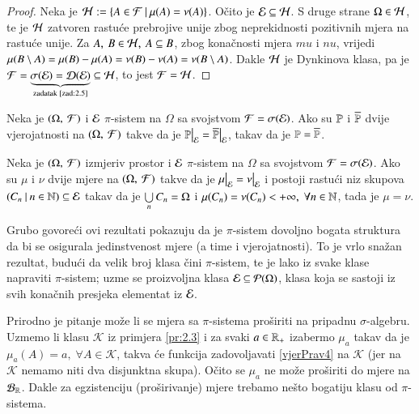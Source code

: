 \begin{proof}
    Neka je $\mathcal{H} := \{{A \in \mathcal{F}} \: | \: {\mu({A}) = \nu(A)}\}$.
    O\v cito je $\mathcal{E} \subseteq \mathcal{H}$. S druge strane $\Omega \in \mathcal{H}$,
    te je $\mathcal{H}$ zatvoren rastu\' ce prebrojive unije zbog
    neprekidnosti pozitivnih mjera na rastu\' ce unije.
    Za $A, \: B \in \mathcal{H}, \: A \subseteq B$, zbog kona\v cnosti mjera
    $mu$ i $nu$, vrijedi $\mu({B \setminus A}) = \mu({B})
    - \mu({A}) = \nu(B) - \nu(A) = \nu(B \setminus A)$.
    Dakle $\mathcal{H}$ je Dynkinova klasa, pa je $\mathcal{F} = \underbrace{
    \sigma({\mathcal{E}}) = \mathcal{D}({\mathcal{E}})}_{\textnormal{zadatak \ref{zad:2.5}}}
    \subseteq \mathcal{H}$, to jest $\mathcal{F} = \mathcal{H}$.
\end{proof}

\begin{kor} \label{kor:2.7}
    Neka je $(\Omega, \: \mathcal{F})$ i $\mathcal{E}$ $\pi$-sistem na $\Omega$ sa
    svojstvom $\mathcal{F} = \sigma({\mathcal{E}})$. Ako su $\mathbb{P}$ i $\overline{\mathbb{P}}$
    dvije vjerojatnosti na $(\Omega, \: \mathcal{F})$ takve da je
    $\restr{\Pp}{\E} = \restr{\overline{\Pp}}{\E}$, takav da je $\mathbb{P}
    = \overline{\mathbb{P}}$.
\end{kor}

\begin{zad} \label{zad:2.9}
    Neka je $(\Omega, \: \mathcal{F})$ izmjeriv prostor i $\mathcal{E}$ $\pi$-sistem
    na $\Omega$ sa svojstvom $\mathcal{F} = \sigma({\mathcal{E}})$.
    Ako su $\mu$ i $\nu$ dvije mjere na $(\Omega, \: \mathcal{F})$ takve
    da je $\restr{\mu}{\E} = \restr{\nu}{\E}$ i postoji rastu\' ci
    niz skupova $({C_n} \: | \: {n \in \mathbb{N}}) \subseteq \mathcal{E}$ takav da je
    $\bigcup\limits_{n}^{}C_n = \Omega$ i $\mu({C_n}) = \nu(C_n) < +\infty, \;
    \forall n \in \mathbb{N}$, tada je $\mu = \nu$.
\end{zad}

\begin{nap} \label{nap:2.10}
    Grubo govore\' ci ovi rezultati pokazuju da je $\pi$-sistem
    dovoljno bogata struktura da bi se osigurala jedinstvenost mjere
    (a time i vjerojatnosti). To je vrlo sna\v zan rezultat,
    budu\' ci da velik broj klasa \v cini $\pi$-sistem, te je lako iz
    svake klase napraviti $\pi$-sistem; uzme se proizvoljna klasa
    $\mathcal{E} \subseteq \mathcal{P}({\Omega})$, klasa koja se sastoji iz svih
    kona\v cnih presjeka elementat iz $\mathcal{E}$.

    Prirodno je pitanje mo\v ze li se mjera sa $\pi$-sistema
    pro\v siriti na pripadnu $\sigma$-algebru. Uzmemo li klasu
    $\mathcal{K}$ iz primjera \ref{pr:2.3} i za svaki $a \in \mathbb{R}_+$
    izabermo $\mu_a$ takav da je $\mu_a(A) = a, \; \forall A \in
    \mathcal{K}$, takva \' ce funkcija zadovoljavati
    \eqref{vjerPrav4} na $\mathcal{K}$ (jer na $\mathcal{K}$ nemamo
    niti dva disjunktna skupa). O\v cito se $\mu_a$ ne mo\v ze
    pro\v siriti do mjere na $\mathcal{B}_{\mathbb{R}}$.
    Dakle za egzistenciju  (pro\v sirivanje) mjere trebamo ne\v sto
    bogatiju klasu od $\pi$-sistema.
\end{nap}

